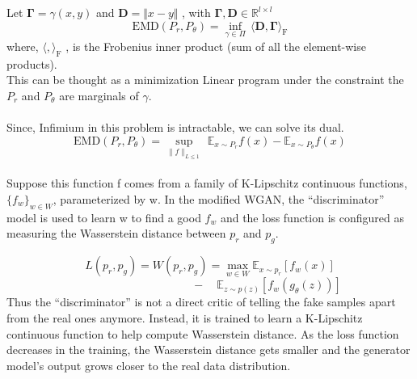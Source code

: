 \documentclass{article}
\begin{document}
Let  \(\mathbf{\Gamma} = \gamma(x,y)\) and \(\mathbf{D} = \Vert x - y \Vert\) , with \( \mathbf{\Gamma}, \mathbf{D} \in \mathbb{R}^{l \times l} \)
\[\mathrm{EMD}(P_r, P_\theta) = \inf_{\gamma \in \Pi} \, \langle \mathbf{D}, \mathbf{\Gamma} \rangle_\mathrm{F} \]
 where, \( \langle , \rangle_\mathrm{F}\) , is the Frobenius inner product (sum of all the element-wise products).
 \\
This can be thought as a minimization Linear program under the constraint the \(P_r\) and \(P_\theta\) are marginals of \(\gamma\).\\\\Since, Infimium in this problem is intractable, we can solve its dual.
 \[\mathrm{EMD}(P_r, P_\theta) = \sup_{\lVert f \lVert_{L \leq 1}} \ \mathbb{E}_{x \sim P_r} f(x) - \mathbb{E}_{x \sim P_\theta} f(x)\]
 \\
 Suppose this function f comes from a family of K-Lipschitz continuous functions, \(\{ f_w \}_{w \in W}\), parameterized by w. In the modified WGAN, the “discriminator” model is used to learn w to find a good \(f_w\) and the loss function is configured as measuring the Wasserstein distance between \(p_r\) and \(p_g\).

\[L(p_r, p_g) = W(p_r, p_g) = \max_{w \in W} \mathbb{E}_{x \sim p_r}[f_w(x)] \]
\[\quad \quad \quad \quad \quad \quad \quad \quad \quad \quad- \quad \mathbb{E}_{z \sim p(z)}[f_w(g_\theta(z))]\]Thus the “discriminator” is not a direct critic of telling the fake samples apart from the real ones anymore. Instead, it is trained to learn a K-Lipschitz continuous function to help compute Wasserstein distance. As the loss function decreases in the training, the Wasserstein distance gets smaller and the generator model’s output grows closer to the real data distribution.

\end{document}
